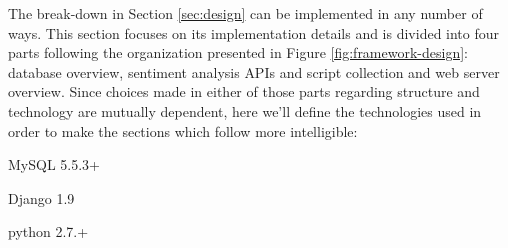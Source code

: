 \newcommand*{\ImplementationPath}{04-framework/02-implementation}

The break-down in Section \ref{sec:design} can be implemented in any number of ways. 
This section focuses on its implementation details and is divided into four parts following the organization presented in Figure \ref{fig:framework-design}: database overview, sentiment analysis APIs and script collection and web server overview. 
Since choices made in either of those parts regarding structure and technology are mutually dependent, here we'll define the technologies used in order to make the sections which follow more intelligible:
\begin{description}
\singlespacing
 \item[DBMS:] MySQL 5.5.3+
 \item[Web framework:] Django 1.9 
 \item[Sentiment analysis scripts:] python 2.7.+
\end{description}








\newpage